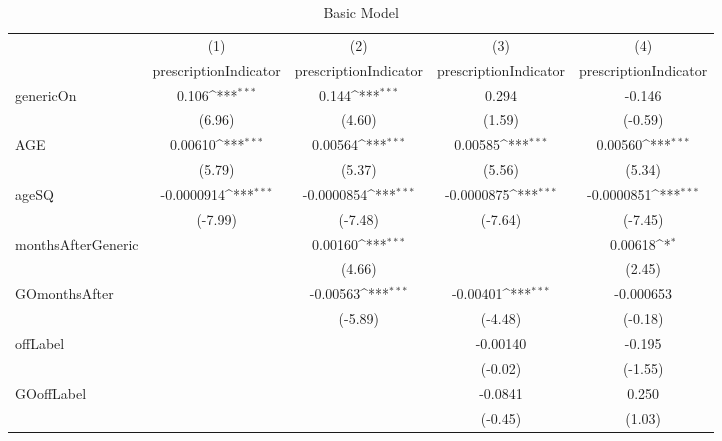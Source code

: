 \begin{table}[htbp]\centering
\def\sym#1{\ifmmode^{#1}\else\(^{#1}\)\fi}
\caption{Basic Model\label{tab1}}
\begin{tabular}{l*{4}{c}}
\hline\hline
            &\multicolumn{1}{c}{(1)}&\multicolumn{1}{c}{(2)}&\multicolumn{1}{c}{(3)}&\multicolumn{1}{c}{(4)}\\
            &\multicolumn{1}{c}{prescriptionIndicator}&\multicolumn{1}{c}{prescriptionIndicator}&\multicolumn{1}{c}{prescriptionIndicator}&\multicolumn{1}{c}{prescriptionIndicator}\\
\hline
genericOn   &       0.106\sym{***}&       0.144\sym{***}&       0.294         &      -0.146         \\
            &      (6.96)         &      (4.60)         &      (1.59)         &     (-0.59)         \\
[1em]
AGE         &     0.00610\sym{***}&     0.00564\sym{***}&     0.00585\sym{***}&     0.00560\sym{***}\\
            &      (5.79)         &      (5.37)         &      (5.56)         &      (5.34)         \\
[1em]
ageSQ       &  -0.0000914\sym{***}&  -0.0000854\sym{***}&  -0.0000875\sym{***}&  -0.0000851\sym{***}\\
            &     (-7.99)         &     (-7.48)         &     (-7.64)         &     (-7.45)         \\
[1em]
monthsAfterGeneric&                     &     0.00160\sym{***}&                     &     0.00618\sym{*}  \\
            &                     &      (4.66)         &                     &      (2.45)         \\
[1em]
GOmonthsAfter&                     &    -0.00563\sym{***}&    -0.00401\sym{***}&   -0.000653         \\
            &                     &     (-5.89)         &     (-4.48)         &     (-0.18)         \\
[1em]
offLabel    &                     &                     &    -0.00140         &      -0.195         \\
            &                     &                     &     (-0.02)         &     (-1.55)         \\
[1em]
GOoffLabel  &                     &                     &     -0.0841         &       0.250         \\
            &                     &                     &     (-0.45)         &      (1.03)         \\

\end{tabular}
\end{table}
